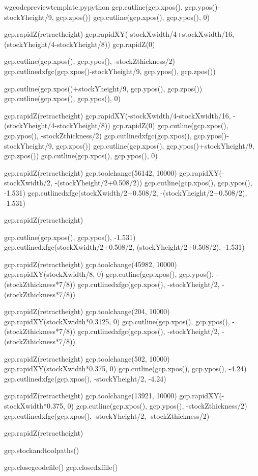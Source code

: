 \documentclass{ltxdoc}
\begin{document}
\begin{writecode}{w}{gcodepreviewtemplate.py}{python}
gcp.cutline(gcp.xpos(), gcp.ypos()-stockYheight/9, gcp.zpos())
gcp.cutline(gcp.xpos(), gcp.ypos(), 0)

gcp.rapidZ(retractheight)
gcp.rapidXY(-stockXwidth/4+stockXwidth/16, -(stockYheight/4-stockYheight/8))
gcp.rapidZ(0)

gcp.cutline(gcp.xpos(), gcp.ypos(), -stockZthickness/2)
gcp.cutlinedxfgc(gcp.xpos()-stockYheight/9, gcp.ypos(), gcp.zpos())

gcp.cutline(gcp.xpos()+stockYheight/9, gcp.ypos(), gcp.zpos())
gcp.cutline(gcp.xpos(), gcp.ypos(), 0)

gcp.rapidZ(retractheight)
gcp.rapidXY(-stockXwidth/4-stockXwidth/16, -(stockYheight/4-stockYheight/8))
gcp.rapidZ(0)
gcp.cutline(gcp.xpos(), gcp.ypos(), -stockZthickness/2)
gcp.cutlinedxfgc(gcp.xpos(), gcp.ypos()-stockYheight/9, gcp.zpos())
gcp.cutline(gcp.xpos(), gcp.ypos()+stockYheight/9, gcp.zpos())
gcp.cutline(gcp.xpos(), gcp.ypos(), 0)

gcp.rapidZ(retractheight)
gcp.toolchange(56142, 10000)
gcp.rapidXY(-stockXwidth/2, -(stockYheight/2+0.508/2))
gcp.cutline(gcp.xpos(), gcp.ypos(), -1.531)
gcp.cutlinedxfgc(stockXwidth/2+0.508/2, -(stockYheight/2+0.508/2), -1.531)

gcp.rapidZ(retractheight)

gcp.cutline(gcp.xpos(), gcp.ypos(), -1.531)
gcp.cutlinedxfgc(stockXwidth/2+0.508/2, (stockYheight/2+0.508/2), -1.531)

gcp.rapidZ(retractheight)
gcp.toolchange(45982, 10000)
gcp.rapidXY(stockXwidth/8, 0)
gcp.cutline(gcp.xpos(), gcp.ypos(), -(stockZthickness*7/8))
gcp.cutlinedxfgc(gcp.xpos(), -stockYheight/2, -(stockZthickness*7/8))

gcp.rapidZ(retractheight)
gcp.toolchange(204, 10000)
gcp.rapidXY(stockXwidth*0.3125, 0)
gcp.cutline(gcp.xpos(), gcp.ypos(), -(stockZthickness*7/8))
gcp.cutlinedxfgc(gcp.xpos(), -stockYheight/2, -(stockZthickness*7/8))

gcp.rapidZ(retractheight)
gcp.toolchange(502, 10000)
gcp.rapidXY(stockXwidth*0.375, 0)
gcp.cutline(gcp.xpos(), gcp.ypos(), -4.24)
gcp.cutlinedxfgc(gcp.xpos(), -stockYheight/2, -4.24)

gcp.rapidZ(retractheight)
gcp.toolchange(13921, 10000)
gcp.rapidXY(-stockXwidth*0.375, 0)
gcp.cutline(gcp.xpos(), gcp.ypos(), -stockZthickness/2)
gcp.cutlinedxfgc(gcp.xpos(), -stockYheight/2, -stockZthickness/2)

gcp.rapidZ(retractheight)

gcp.stockandtoolpaths()

gcp.closegcodefile()
gcp.closedxffile()

\end{writecode}
\addtocounter{gcptmplpy}{281}
\end{document}
